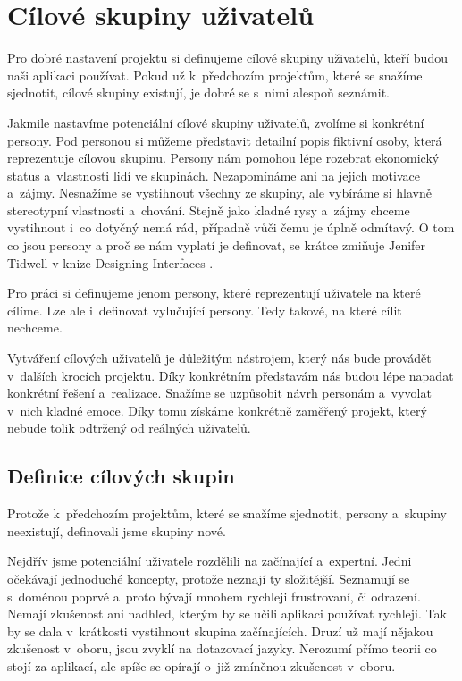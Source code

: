 \chapter{Cílové skupiny uživatelů}

Pro dobré nastavení projektu si definujeme cílové skupiny uživatelů, kteří budou naši aplikaci používat. Pokud už k~předchozím projektům, které se snažíme sjednotit, cílové skupiny existují, je dobré se s~nimi alespoň seznámit.

Jakmile nastavíme potenciální cílové skupiny uživatelů, zvolíme si konkrétní persony. Pod personou si můžeme představit detailní popis fiktivní osoby, která reprezentuje cílovou skupinu. Persony nám pomohou lépe rozebrat ekonomický status a~vlastnosti lidí ve skupinách. Nezapomínáme ani na jejich motivace a~zájmy. Nesnažíme se vystihnout všechny ze skupiny, ale vybíráme si hlavně stereotypní vlastnosti a~chování. Stejně jako kladné rysy a~zájmy chceme vystihnout i~co dotyčný nemá rád, případně vůči čemu je úplně odmítavý. O tom co jsou persony a proč se nám vyplatí je definovat, se krátce zmiňuje Jenifer Tidwell v knize Designing Interfaces \cite{Designing_ifaces_2nd_edition}.

Pro práci si definujeme jenom persony, které reprezentují uživatele na které cílíme. Lze ale i~definovat vylučující persony. Tedy takové, na které cílit nechceme.

Vytváření cílových uživatelů je důležitým nástrojem, který nás bude provádět v~dalších krocích projektu. Díky konkrétním představám nás budou lépe napadat konkrétní řešení a~realizace. Snažíme se uzpůsobit návrh personám a~vyvolat v~nich kladné emoce. Díky tomu získáme konkrétně zaměřený projekt, který nebude tolik odtržený od reálných uživatelů.

\section{Definice cílových skupin}

Protože k~předchozím projektům, které se snažíme sjednotit, persony a~skupiny neexistují, definovali jsme skupiny nové.

Nejdřív jsme potenciální uživatele rozdělili na začínající a~expertní. Jedni očekávají jednoduché koncepty, protože neznají ty složitější. Seznamují se s~doménou poprvé a~proto bývají mnohem rychleji frustrovaní, či odrazení. Nemají zkušenost ani nadhled, kterým by se učili aplikaci používat rychleji. Tak by se dala v~krátkosti vystihnout skupina začínajících. Druzí už mají nějakou zkušenost v~oboru, jsou zvyklí na dotazovací jazyky. Nerozumí přímo teorii co stojí za aplikací, ale spíše se opírají o~již zmíněnou zkušenost v~oboru.

